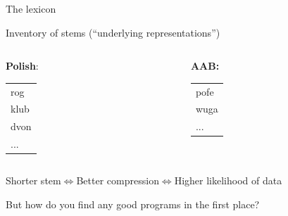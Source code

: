 \documentclass{beamer}
\begin{document}
\begin{frame}{The lexicon}
  \large
  
  Inventory of stems (``underlying representations'')

  
  \vspace{1cm}
  \centering
\begin{columns}[T] %
  \begin{column}{.25\textwidth}
  \textbf{Polish}:    
  \\\begin{tabular}{l}
    
    rog\\
    klub\\
    dvon\\
    ...
    \end{tabular}

    \end{column}%
\begin{column}{.25\textwidth}
\textbf{AAB:}
\\\begin{tabular}{l}
pofe\\
wuga\\
...
  \end{tabular}
  

  
      \end{column}%
\end{columns}

\vspace{1cm}

Shorter stem$\iff$Better compression$\iff$Higher likelihood of data 

\end{frame}



\begin{frame}{}

  \Huge
\centering  But how do you find any good programs in the first place?
  
  \end{frame}
\end{document}
